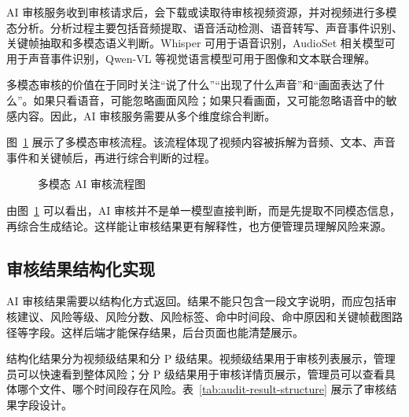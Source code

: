 AI 审核服务收到审核请求后，会下载或读取待审核视频资源，并对视频进行多模态分析。分析过程主要包括音频提取、语音活动检测、语音转写、声音事件识别、关键帧抽取和多模态语义判断。Whisper 可用于语音识别，AudioSet 相关模型可用于声音事件识别，Qwen-VL 等视觉语言模型可用于图像和文本联合理解\cite{radford2023whisper}。

多模态审核的价值在于同时关注“说了什么”“出现了什么声音”和“画面表达了什么”。如果只看语音，可能忽略画面风险；如果只看画面，又可能忽略语音中的敏感内容。因此，AI 审核服务需要从多个维度综合判断。

图~\ref{fig:multimodal-audit-flow} 展示了多模态审核流程。该流程体现了视频内容被拆解为音频、文本、声音事件和关键帧后，再进行综合判断的过程。

\begin{figure}[htbp]
  \centering
  \caption{多模态 AI 审核流程图}
  \label{fig:multimodal-audit-flow}
\end{figure}

由图~\ref{fig:multimodal-audit-flow} 可以看出，AI 审核并不是单一模型直接判断，而是先提取不同模态信息，再综合生成结论。这样能让审核结果更有解释性，也方便管理员理解风险来源。

\subsection{审核结果结构化实现}
\label{subsec:audit-result-structured}

AI 审核结果需要以结构化方式返回。结果不能只包含一段文字说明，而应包括审核建议、风险等级、风险分数、风险标签、命中时间段、命中原因和关键帧截图路径等字段。这样后端才能保存结果，后台页面也能清楚展示。

结构化结果分为视频级结果和分 P 级结果。视频级结果用于审核列表展示，管理员可以快速看到整体风险；分 P 级结果用于审核详情页展示，管理员可以查看具体哪个文件、哪个时间段存在风险。表~\ref{tab:audit-result-structure} 展示了审核结果字段设计。

